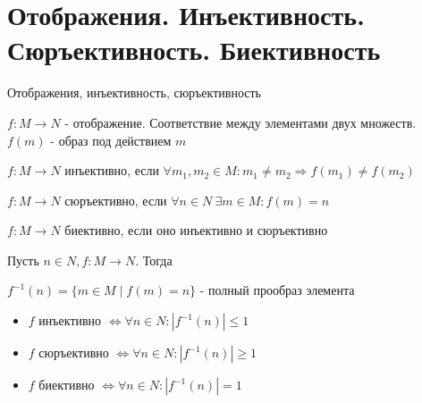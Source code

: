 
\section{Отображения. Инъективность. Сюръективность. Биективность}
Отображения, инъективность, сюръективность
\begin{conj} 
    $f: M \to N$ - отображение. Соответствие между      элементами двух множеств. $f(m)$ - образ под действием $m$
\end{conj}
\begin{conj}
    $f: M \to N$ инъективно, если $\forall m_1, m_2 \in M : m_1\neq m_2 \Rightarrow f(m_1)\neq f(m_2)$
\end{conj}
\begin{conj}
    $f: M \to N$ сюръективно, если $\forall n \in N\ \exists m \in M : f(m) = n$
\end{conj}
\begin{conj}
    $f: M \to N$ биективно, если оно инъективно и сюръективно
\end{conj}
\begin{conj}
    Пусть $n\in N, f: M\to N$. Тогда 
    
    $f^{-1}(n) = \{m \in M \mid f(m)=n\}$ - полный прообраз элемента
\end{conj}
\begin{itemize}
    \item[] $f$ инъективно $\Leftrightarrow \forall n \in N : |f^{-1}(n)|\leq 1$
    
    \item[] $f$ сюръективно $\Leftrightarrow \forall n \in N : |f^{-1}(n)| \geq 1$
    
    \item[] $f$ биективно $\Leftrightarrow \forall n \in N : |f^{-1}(n)| = 1$
\end{itemize}
